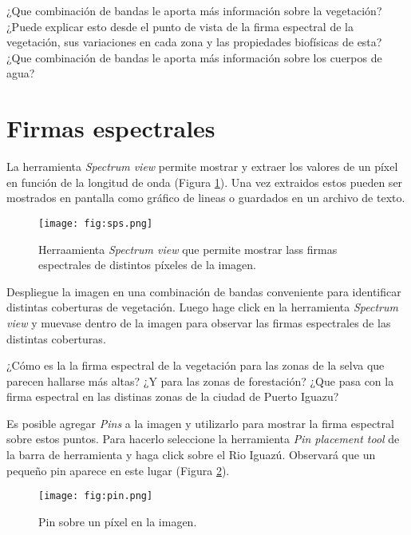 \begin{que}
    ¿Que combinación de bandas le aporta más información sobre la vegetación? ¿Puede explicar esto desde el punto de vista de la firma espectral de la vegetación, sus variaciones en cada zona y las propiedades biofísicas de esta? ¿Que combinación de bandas le aporta más información sobre los cuerpos de agua?
\end{que}

\section{Firmas espectrales}

La herramienta \emph{Spectrum view} permite mostrar y extraer los valores de un píxel en función de la longitud de onda (Figura \ref{fig:sps}). Una vez extraidos estos pueden ser mostrados en pantalla como gráfico de lineas o guardados en un archivo de texto.

\begin{figure}[h!]
    \centering
    \texttt{[image: fig:sps.png]}
    \caption{Herraamienta \emph{Spectrum view} que permite mostrar lass firmas espectrales de distintos píxeles de la imagen.}
    \label{fig:sps}
\end{figure}

Despliegue la imagen  en una combinación de bandas conveniente para identificar distintas coberturas de vegetación. Luego hage click en la herramienta \emph{Spectrum view} y muevase dentro de la imagen para observar las firmas espectrales de las distintas coberturas.

\begin{que}
    ¿Cómo es la la firma espectral de la vegetación para las zonas de la selva que parecen hallarse más altas? ¿Y para las zonas de forestación? ¿Que pasa con la firma espectral en las distinas zonas de la ciudad de Puerto Iguazu?
\end{que}

Es posible agregar \emph{Pins} a la imagen y utilizarlo para mostrar la firma espectral sobre estos puntos. Para hacerlo seleccione la herramienta \emph{Pin placement tool} de la barra de herramienta y haga click sobre el Rio Iguazú. Observará que un pequeño pin aparece en este lugar (Figura \ref{fig:pin}).

\begin{figure}[h!]
    \centering
    \texttt{[image: fig:pin.png]}
    \caption{Pin sobre un píxel en la imagen.}
    \label{fig:pin}
\end{figure}

